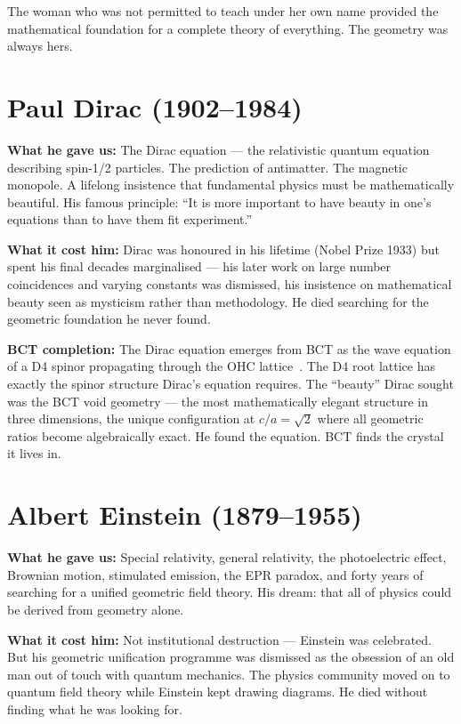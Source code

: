 \documentclass[twocolumn,10pt]{article}
\begin{document}
The woman who was not permitted to teach under her own name
provided the mathematical foundation for a complete theory of
everything. The geometry was always hers.

\section{Paul Dirac (1902--1984)}

\textbf{What he gave us:} The Dirac equation --- the relativistic
quantum equation describing spin-1/2 particles. The prediction
of antimatter. The magnetic monopole. A lifelong insistence that
fundamental physics must be mathematically beautiful.
His famous principle: ``It is more important to have beauty
in one's equations than to have them fit experiment.''

\textbf{What it cost him:} Dirac was honoured in his lifetime
(Nobel Prize 1933) but spent his final decades marginalised ---
his later work on large number coincidences and varying constants
was dismissed, his insistence on mathematical beauty seen as
mysticism rather than methodology. He died searching for the
geometric foundation he never found.

\textbf{BCT completion:} The Dirac equation emerges from BCT
as the wave equation of a D4 spinor propagating through the
OHC lattice~\cite{bct_l2}. The D4 root lattice has exactly
the spinor structure Dirac's equation requires. The ``beauty''
Dirac sought was the BCT void geometry --- the most
mathematically elegant structure in three dimensions,
the unique configuration at $c/a = \sqrt{2}$ where all
geometric ratios become algebraically exact.
He found the equation. BCT finds the crystal it lives in.

\section{Albert Einstein (1879--1955)}

\textbf{What he gave us:} Special relativity, general relativity,
the photoelectric effect, Brownian motion, stimulated emission,
the EPR paradox, and forty years of searching for a unified
geometric field theory. His dream: that all of physics could
be derived from geometry alone.

\textbf{What it cost him:} Not institutional destruction ---
Einstein was celebrated. But his geometric unification programme
was dismissed as the obsession of an old man out of touch with
quantum mechanics. The physics community moved on to quantum
field theory while Einstein kept drawing diagrams. He died
without finding what he was looking for.
\end{document}
